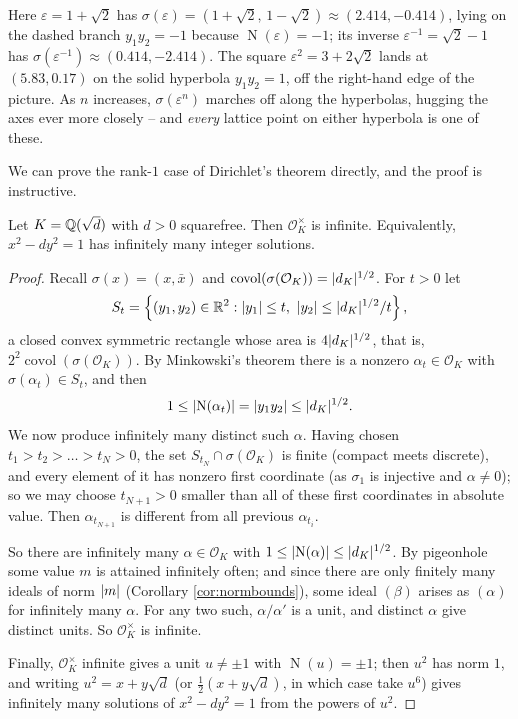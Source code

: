 \documentclass[a4paper]{scrartcl}
\renewcommand{\OO}{\mathcal{O}}
\newcommand{\Nm}{\operatorname{N}}
\newcommand{\covol}{\operatorname{covol}}
\begin{document}
Here $\varepsilon = 1+\sqrt2$ has $\sigma(\varepsilon) = (1+\sqrt2,\,1-\sqrt2)\approx(2.414,-0.414)$, lying on the dashed branch $y_1y_2 = -1$ because $\Nm(\varepsilon) = -1$; its inverse $\varepsilon^{-1} = \sqrt2-1$ has $\sigma(\varepsilon^{-1}) \approx (0.414,-2.414)$. The square $\varepsilon^2 = 3+2\sqrt2$ lands at $(5.83, 0.17)$ on the solid hyperbola $y_1y_2 = 1$, off the right-hand edge of the picture. As $n$ increases, $\sigma(\varepsilon^n)$ marches off along the hyperbolas, hugging the axes ever more closely -- and \emph{every} lattice point on either hyperbola is one of these.

We can prove the rank-$1$ case of Dirichlet's theorem directly, and the proof is instructive.

\begin{theorem}[Pell]\label{thm:pell}
	Let $K = \mathbb{Q}(\sqrt d)$ with $d > 0$ squarefree. Then $\OO_K^\times$ is infinite. Equivalently, $x^2-dy^2 = 1$ has infinitely many integer solutions.
\end{theorem}

\begin{proof}
	Recall $\sigma(x) = (x,\bar x)$ and $\covol(\sigma(\OO_K)) = \abs{d_K}^{1/2}$. For $t > 0$ let
	$$S_t = \left\{(y_1,y_2) \in \mathbb{R}^2 : \lvert y_1\rvert\le t,\ \lvert y_2\rvert\le \lvert d_K\rvert^{1/2}/t\right\},$$
	a closed convex symmetric rectangle whose area is $4\lvert d_K\rvert^{1/2}$, that is, $2^2\covol(\sigma(\OO_K))$. By Minkowski's theorem there is a nonzero $\alpha_t \in \OO_K$ with $\sigma(\alpha_t)\in S_t$, and then
	$$1 \le \abs{\Nm(\alpha_t)} = \abs{y_1y_2} \le \abs{d_K}^{1/2}.$$
	We now produce infinitely many distinct such $\alpha$. Having chosen $t_1 > t_2 > \dots > t_N > 0$, the set $S_{t_N}\cap\sigma(\OO_K)$ is finite (compact meets discrete), and every element of it has nonzero first coordinate (as $\sigma_1$ is injective and $\alpha \neq 0$); so we may choose $t_{N+1} > 0$ smaller than all of these first coordinates in absolute value. Then $\alpha_{t_{N+1}}$ is different from all previous $\alpha_{t_i}$.

	So there are infinitely many $\alpha \in \OO_K$ with $1 \le \abs{\Nm(\alpha)}\le\abs{d_K}^{1/2}$. By pigeonhole some value $m$ is attained infinitely often; and since there are only finitely many ideals of norm $\lvert m\rvert$ (Corollary \ref{cor:normbounds}), some ideal $(\beta)$ arises as $(\alpha)$ for infinitely many $\alpha$. For any two such, $\alpha/\alpha'$ is a unit, and distinct $\alpha$ give distinct units. So $\OO_K^\times$ is infinite.

	Finally, $\OO_K^\times$ infinite gives a unit $u \neq \pm1$ with $\Nm(u) = \pm1$; then $u^2$ has norm $1$, and writing $u^2 = x+y\sqrt d$ (or $\tfrac12(x+y\sqrt d)$, in which case take $u^6$) gives infinitely many solutions of $x^2-dy^2=1$ from the powers of $u^2$.
\end{proof}
\end{document}
